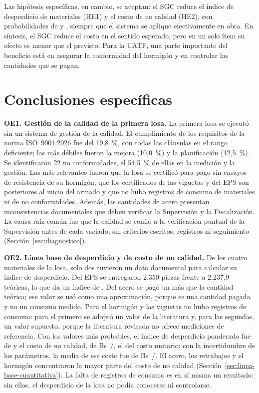 Las hipótesis específicas, en cambio, se aceptan: el SGC reduce el índice de desperdicio de materiales (HE1) y el costo de no calidad (HE2), con probabilidades de \PHEuno{} y \PHEdos{}, siempre que el sistema se aplique efectivamente en obra. En síntesis, el SGC reduce el costo en el sentido esperado, pero en un solo ítem su efecto es menor que el previsto. Para la UATF, una parte importante del beneficio está en asegurar la conformidad del hormigón y en controlar las cantidades que se pagan.

\section{Conclusiones específicas}

\textbf{OE1. Gestión de la calidad de la primera losa.} La primera losa se ejecutó sin un sistema de gestión de la calidad. El cumplimiento de los requisitos de la norma ISO~9001:2026 fue del 19,8~\%, con todas las cláusulas en el rango deficiente; las más débiles fueron la mejora (10,0~\%) y la planificación (12,5~\%). Se identificaron 22 no conformidades, el 54,5~\% de ellas en la medición y la gestión. Las más relevantes fueron que la losa se certificó para pago sin ensayos de resistencia de su hormigón, que los certificados de las viguetas y del EPS son posteriores al inicio del armado y que no hubo registros de consumo de materiales ni de no conformidades. Además, las cantidades de acero presentan inconsistencias documentales que deben verificar la Supervisión y la Fiscalización. La causa raíz común fue que la calidad se confió a la verificación puntual de la Supervisión antes de cada vaciado, sin criterios escritos, registros ni seguimiento (Sección~\ref{sec:diagnostico}).

\textbf{OE2. Línea base de desperdicio y de costo de no calidad.} De los cuatro materiales de la losa, solo dos tuvieron un dato documental para calcular su índice de desperdicio. Del EPS se entregaron 2.350 piezas frente a 2.237,9 teóricas, lo que da un índice de \IDMsinEps{}. Del acero se pagó un \IDMsinAce{} más que la cantidad teórica; ese valor se usó como una aproximación, porque es una cantidad pagada y no un consumo medido. Para el hormigón y las viguetas no hubo registros de consumo: para el primero se adoptó un valor de la literatura y, para las segundas, un valor supuesto, porque la literatura revisada no ofrece mediciones de referencia. Con los valores más probables, el índice de desperdicio ponderado fue de \IDMsinDet{} y el costo de no calidad, de Bs~\CNCsinDet/\mdos{}, el \CNCsinDetPct{} del costo unitario; con la incertidumbre de los parámetros, la media de ese costo fue de Bs~\CNCsinMedia/\mdos{}. El acero, los retrabajos y el hormigón concentraron la mayor parte del costo de no calidad (Sección~\ref{sec:linea-base-cuantitativa}). La falta de registros de consumo es en sí misma un resultado: sin ellos, el desperdicio de la losa no podía conocerse ni controlarse.

